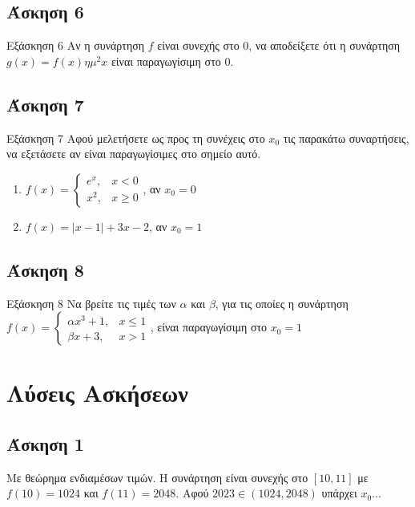 \documentclass[greek]{beamer}
\begin{document}
\subsection{Άσκηση 6}
\begin{frame}[label=Άσκηση6]{Εξάσκηση 6}
 Αν η συνάρτηση $f$ είναι συνεχής στο $0$, να αποδείξετε ότι η συνάρτηση $g(x)=f(x)ημ^2x$ είναι παραγωγίσιμη στο $0$.

\end{frame}

\subsection{Άσκηση 7}
\begin{frame}{Εξάσκηση 7}
 Αφού μελετήσετε ως προς τη συνέχεις στο $x_0$ τις παρακάτω συναρτήσεις, να εξετάσετε αν είναι παραγωγίσιμες στο σημείο αυτό.
 \begin{enumerate}
  \item<1-> $f(x)=\begin{cases}
     e^x, & x<0    \\
     x^2, & x\ge 0
    \end{cases}$, αν $x_0=0$
  \item<2-> $f(x)=|x-1|+3x-2$, αν $x_0=1$
 \end{enumerate}
\end{frame}

\subsection{Άσκηση 8}
\begin{frame}{Εξάσκηση 8}
 Να βρείτε τις τιμές των $α$ και $β$, για τις οποίες η συνάρτηση
 $f(x)=\begin{cases}
   αx^3+1, & x\le 1 \\
   βx+3,   & x >1
  \end{cases}$, είναι παραγωγίσιμη στο $x_0=1$
\end{frame}

\appendix
\section{Λύσεις Ασκήσεων}
\begin{frame}
 \tableofcontents
\end{frame}

\subsection{Άσκηση 1}
\begin{frame}[label=Λύση1]
 Με θεώρημα ενδιαμέσων τιμών. Η συνάρτηση είναι συνεχής στο $[10,11]$ με $f(10)=1024$ και $f(11)=2048$. Αφού $2023\in (1024,2048)$ υπάρχει $x_0$...

 \hyperlink{Άσκηση1}{}
\end{frame}
\end{document}
